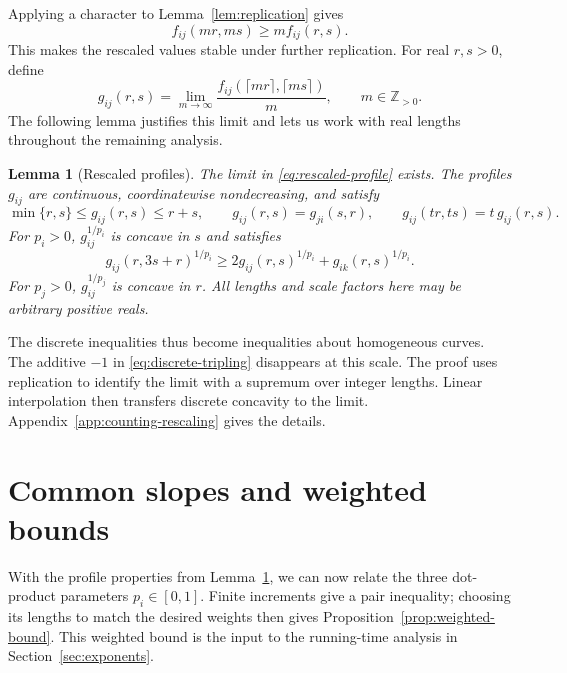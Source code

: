 \documentclass[11pt]{article}
\newtheorem{lemma}[theorem]{Lemma}
\begin{document}
Applying a character to Lemma~\ref{lem:replication} gives
\begin{equation}\label{eq:profile-replication}
 f_{ij}(mr,ms)\ge m f_{ij}(r,s).
\end{equation}
This makes the rescaled values stable under further replication.
For real $r,s>0$, define
\begin{equation}\label{eq:rescaled-profile}
 g_{ij}(r,s)=\lim_{m\to\infty}
 \frac{f_{ij}(\lceil mr\rceil,\lceil ms\rceil)}{m},
 \qquad m\in\mathbb Z_{>0}.
\end{equation}
The following lemma justifies this limit and lets us work with real
lengths throughout the remaining analysis.

\begin{lemma}[Rescaled profiles]\label{lem:homogeneous}
The limit in \eqref{eq:rescaled-profile} exists. The profiles $g_{ij}$
are continuous, coordinatewise nondecreasing, and satisfy
\begin{equation}\label{eq:limit-rank}
 \min\{r,s\}\le g_{ij}(r,s)\le r+s,\qquad
 g_{ij}(r,s)=g_{ji}(s,r),\qquad
 g_{ij}(tr,ts)=t\,g_{ij}(r,s).
\end{equation}
For $p_i>0$, $g_{ij}^{1/p_i}$ is concave in $s$ and satisfies
\begin{equation}\label{eq:general-tripling}
 g_{ij}(r,3s+r)^{1/p_i}
 \ge2g_{ij}(r,s)^{1/p_i}+g_{ik}(r,s)^{1/p_i}.
\end{equation}
For $p_j>0$, $g_{ij}^{1/p_j}$ is concave in $r$.
All lengths and scale factors here may be arbitrary positive reals.
\end{lemma}

The discrete inequalities thus become inequalities about homogeneous
curves. The additive $-1$ in \eqref{eq:discrete-tripling} disappears at
this scale. The proof uses replication to identify the limit with a
supremum over integer lengths. Linear interpolation then transfers
discrete concavity to the limit. Appendix~\ref{app:counting-rescaling}
gives the details.

\section{Common slopes and weighted bounds}\label{sec:slopes}

With the profile properties from Lemma~\ref{lem:homogeneous}, we can now
relate the three dot-product parameters $p_i\in[0,1]$. Finite increments
give a pair inequality; choosing its lengths to match the desired weights
then gives Proposition~\ref{prop:weighted-bound}. This weighted bound is
the input to the running-time analysis in Section~\ref{sec:exponents}.
\end{document}
